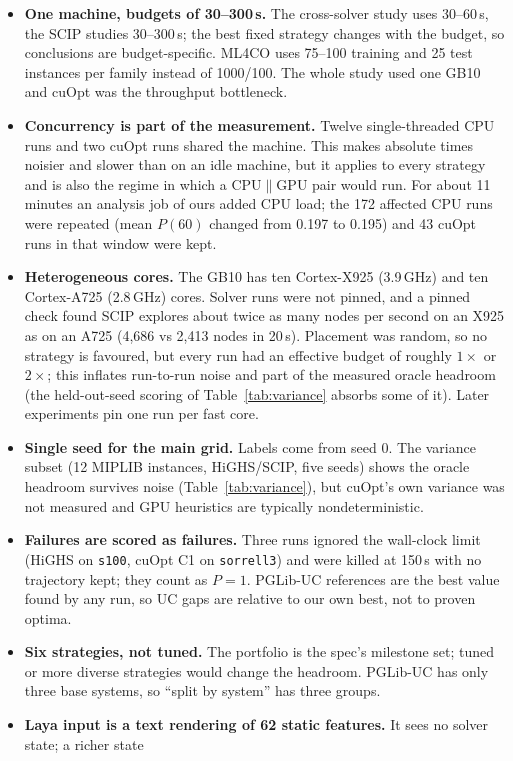 \begin{itemize}
\item \textbf{One machine, budgets of 30--300\,s.} The cross-solver study uses 30--60\,s, the SCIP studies 30--300\,s;
the best fixed strategy changes with the budget, so conclusions are budget-specific. ML4CO uses 75--100
training and 25 test instances per family instead of 1000/100. The whole study used one GB10 and cuOpt was the
throughput bottleneck.
\item \textbf{Concurrency is part of the measurement.} Twelve single-threaded CPU runs and two cuOpt runs shared the
machine. This makes absolute times noisier and slower than on an idle machine, but it applies to every strategy
and is also the regime in which a CPU$\|$GPU pair would run. For about 11 minutes an analysis job of ours added
CPU load; the 172 affected CPU runs were repeated (mean $P(60)$ changed from 0.197 to 0.195) and 43 cuOpt runs in
that window were kept.
\item \textbf{Heterogeneous cores.} The GB10 has ten Cortex-X925 (3.9\,GHz) and ten Cortex-A725 (2.8\,GHz) cores. Solver
runs were not pinned, and a pinned check found SCIP explores about twice as many nodes per second on an X925 as on
an A725 (4,686 vs 2,413 nodes in 20\,s). Placement was random, so no strategy is favoured, but every run had an
effective budget of roughly $1\times$ or $2\times$; this inflates run-to-run noise and part of the measured oracle
headroom (the held-out-seed scoring of Table~\ref{tab:variance} absorbs some of it). Later experiments pin one run per
fast core.
\item \textbf{Single seed for the main grid.} Labels come from seed 0. The variance subset (12 MIPLIB instances,
HiGHS/SCIP, five seeds) shows the oracle headroom survives noise (Table~\ref{tab:variance}), but cuOpt's own
variance was not measured and GPU heuristics are typically nondeterministic.
\item \textbf{Failures are scored as failures.} Three runs ignored the wall-clock limit (HiGHS on \texttt{s100},
cuOpt C1 on \texttt{sorrell3}) and were killed at 150\,s with no trajectory kept; they count as $P=1$. PGLib-UC
references are the best value found by any run, so UC gaps are relative to our own best, not to proven optima.
\item \textbf{Six strategies, not tuned.} The portfolio is the spec's milestone set; tuned or more diverse
strategies would change the headroom. PGLib-UC has only three base systems, so ``split by system'' has three groups.
\item \textbf{Laya input is a text rendering of 62 static features.} It sees no solver state; a richer state

\end{itemize}
